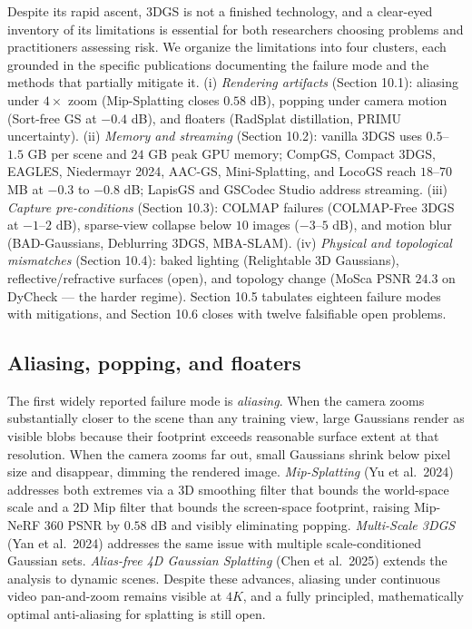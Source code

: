\documentclass{article}
\begin{document}
Despite its rapid ascent, 3DGS is not a finished technology, and a clear-eyed inventory of its limitations is essential for both researchers choosing problems and practitioners assessing risk. We organize the limitations into four clusters, each grounded in the specific publications documenting the failure mode and the methods that partially mitigate it. (i) \emph{Rendering artifacts} (Section 10.1): aliasing under \(4\times\) zoom (Mip-Splatting closes \(0.58\) dB), popping under camera motion (Sort-free GS at \(-0.4\) dB), and floaters (RadSplat distillation, PRIMU uncertainty). (ii) \emph{Memory and streaming} (Section 10.2): vanilla 3DGS uses \(0.5\)--\(1.5\) GB per scene and \(24\) GB peak GPU memory; CompGS, Compact 3DGS, EAGLES, Niedermayr 2024, AAC-GS, Mini-Splatting, and LocoGS reach \(18\)--\(70\) MB at \(-0.3\) to \(-0.8\) dB; LapisGS \cite{shi2025lapisgslayeredprog} and GSCodec Studio \cite{li2026gscodecstudioamodu} address streaming. (iii) \emph{Capture pre-conditions} (Section 10.3): COLMAP failures (COLMAP-Free 3DGS at \(-1\)--\(2\) dB), sparse-view collapse below \(10\) images (\(-3\)--\(5\) dB), and motion blur (BAD-Gaussians, Deblurring 3DGS, MBA-SLAM). (iv) \emph{Physical and topological mismatches} (Section 10.4): baked lighting (Relightable 3D Gaussians), reflective/refractive surfaces (open), and topology change (MoSca PSNR \(24.3\) on DyCheck --- the harder regime). Section 10.5 tabulates eighteen failure modes with mitigations, and Section 10.6 closes with twelve falsifiable open problems.

\subsection{Aliasing, popping, and floaters}\label{aliasing-popping-and-floaters}

The first widely reported failure mode is \emph{aliasing}. When the camera zooms substantially closer to the scene than any training view, large Gaussians render as visible blobs because their footprint exceeds reasonable surface extent at that resolution. When the camera zooms far out, small Gaussians shrink below pixel size and disappear, dimming the rendered image. \emph{Mip-Splatting} (Yu et al.~2024) addresses both extremes via a 3D smoothing filter that bounds the world-space scale and a 2D Mip filter that bounds the screen-space footprint, raising Mip-NeRF 360 PSNR by \(0.58\) dB and visibly eliminating popping. \emph{Multi-Scale 3DGS} (Yan et al.~2024) addresses the same issue with multiple scale-conditioned Gaussian sets. \emph{Alias-free 4D Gaussian Splatting} (Chen et al.~2025) extends the analysis to dynamic scenes. Despite these advances, aliasing under continuous video pan-and-zoom remains visible at \(4K\), and a fully principled, mathematically optimal anti-aliasing for splatting is still open.
\end{document}
